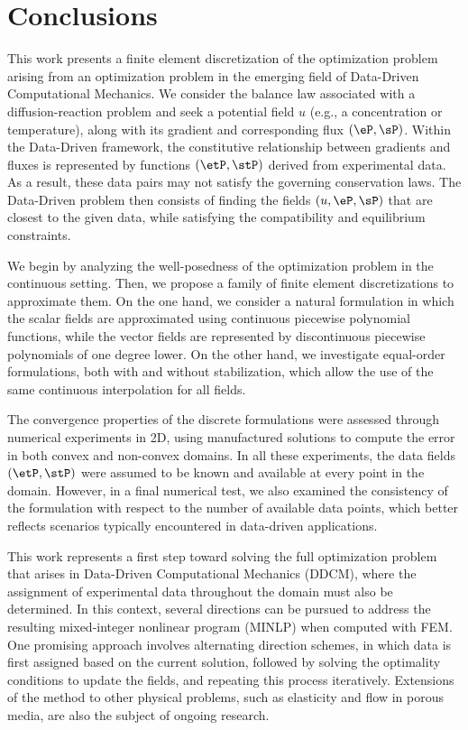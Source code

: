 \section{Conclusions}

This work presents a finite element discretization of the optimization problem arising from an optimization problem in the emerging field of Data-Driven Computational Mechanics.
We consider the balance law associated with a diffusion-reaction problem and seek a potential field $u$ (e.g., a concentration or temperature), along with its gradient and corresponding flux $(\eP, \sP)$.
Within the Data-Driven framework, the constitutive relationship between gradients and fluxes is represented by functions $(\etP, \stP)$ derived from experimental data. As a result, these data pairs may not satisfy the governing conservation laws. The Data-Driven problem then consists of finding the fields $(u, \eP, \sP)$ that are closest to the given data, while satisfying the compatibility and equilibrium constraints.

We begin by analyzing the well-posedness of the optimization problem in the continuous setting. Then, we propose a family of finite element discretizations to approximate them.
On the one hand, we consider a natural formulation in which the scalar fields are approximated using continuous piecewise polynomial functions, while the vector fields are represented by discontinuous piecewise polynomials of one degree lower.
On the other hand, we investigate equal-order formulations, both with and without stabilization, which allow the use of the same continuous interpolation for all fields.

The convergence properties of the discrete formulations were assessed through numerical experiments in 2D, using manufactured solutions to compute the error in both convex and non-convex domains. In all these experiments, the data fields $(\etP, \stP)$ were assumed to be known and available at every point in the domain. However, in a final numerical test, we also examined the consistency of the formulation with respect to the number of available data points, which better reflects scenarios typically encountered in data-driven applications.

This work represents a first step toward solving the full optimization problem that arises in Data-Driven Computational Mechanics (DDCM), where the assignment of experimental data throughout the domain must also be determined. In this context, several directions can be pursued to address the resulting mixed-integer nonlinear program (MINLP) when computed with FEM. One promising approach involves alternating direction schemes, in which data is first assigned based on the current solution, followed by solving the optimality conditions to update the fields, and repeating this process iteratively. Extensions of the method to other physical problems, such as elasticity and flow in porous media, are also the subject of ongoing research.
